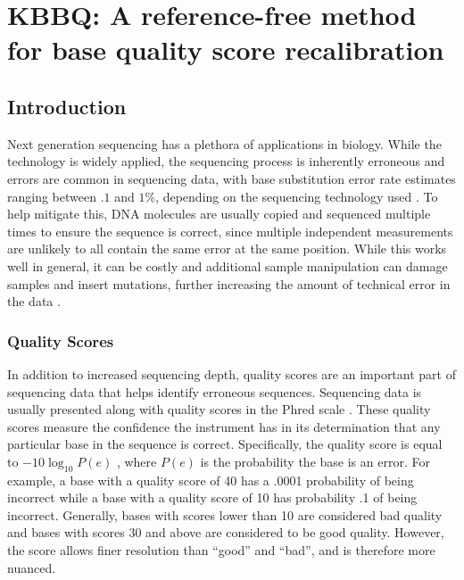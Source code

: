 \chapter{KBBQ: A reference-free method for base quality score recalibration}
\label{ch:kbbq}
\section{Introduction}

Next generation sequencing has a plethora of applications in biology. %
While the technology is widely applied, the sequencing process is inherently erroneous and errors are common in sequencing data, with base substitution error rate estimates ranging between $.1$ and $1\%$, depending on the sequencing technology used \parencite{fox_accuracy_2014}.
To help mitigate this, DNA molecules are usually copied and sequenced multiple times to ensure the sequence is correct, since multiple independent measurements are unlikely to all contain the same error at the same position. While this works well in general, it can be costly and additional sample manipulation can damage samples and insert mutations, further increasing the amount of technical error in the data \parencite{schirmer_insight_2015, ma_analysis_2019}.

\subsection{Quality Scores}

In addition to increased sequencing depth, quality scores are an important part of sequencing data that helps identify erroneous sequences. Sequencing data is usually presented along with quality scores in the Phred scale \parencite{ewing_base-calling_1998, ewing_base-calling_1998-1}.
These quality scores measure the confidence the instrument has in its determination that any particular base in the sequence is correct.
Specifically, the quality score is equal to $-10\log_{10}P(e)$ \parencite{ewing_base-calling_1998,ewing_base-calling_1998-1}, where $P(e)$ is the probability the base is an error.
For example, a base with a quality score of 40 has a .0001 probability of being incorrect while a base with a quality score of 10 has probability .1 of being incorrect. Generally, bases with scores lower than 10 are considered bad quality and bases with scores 30 and above are considered to be good quality. However, the score allows finer resolution than ``good'' and ``bad'', and is therefore more nuanced.

